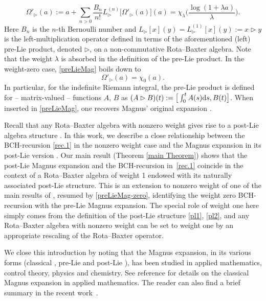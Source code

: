 \documentclass[pdftex]{sigma}
\numberwithin{equation}{section}
\begin{document}
\begin{equation}
\label{preLieMag}
\Omega'_\rhd(a)
:= a + \sum_{n>0} \frac{B_n}{n!} L^{(n)}_{\rhd}\big[\Omega'_\rhd(a)\big](a)
= \chi_{\lambda}\bigg( \frac{\log(1+\lambda a)}{\lambda}\bigg).
\end{equation}
Here $B_n$ is the $n$-th Bernoulli number and $L_{\rhd}[x](y)=L^{(1)}_{\rhd}[x](y):=x \rhd y$ is the left-multiplication operator defined in terms of the aforementioned (left) pre-Lie product, denoted $\rhd$, on a non-commutative Rota--Baxter algebra. Note that the weight $\lambda$ is absorbed in the definition of the pre-Lie product. In the weight-zero case, \eqref{preLieMag} boils down to
\begin{equation}
\label{preLieMag-zero}
\Omega'_\rhd(a)
= \chi_{0}(a).
\end{equation}
In particular, for the indefinite Riemann integral, the pre-Lie product is defined for -- matrix-valued -- functions $A$, $B$ as $(A \rhd B)(t):=\big[\int_0^tA(s){\rm d}s,B(t)\big]$. When inserted in \eqref{preLieMag}, one recovers Magnus' original expansion \cite{WM54}.

Recall that any Rota--Baxter algebra with nonzero weight gives rise to a post-Lie algebra structure \cite{BGN10}. In this work, we describe a close relationship between the BCH-recursion \eqref{rec.1} in the nonzero weight case and the Magnus expansion in its post-Lie version \cite{ELM2015, EI2018, EIM2017,Men2020}. Our main result (Theorem \ref{main Theorem}) shows that the post-Lie Magnus expansion and the BCH-recursion in~\eqref{rec.1} coincide in the context of a Rota--Baxter algebra of weight 1 endowed with its naturally associated post-Lie structure. This is an extension to nonzero weight of one of the main results of \cite{KLM06}, resumed by \eqref{preLieMag-zero}, identifying the weight zero BCH-recursion with the pre-Lie Magnus expansion. The special role of weight one here simply comes from the definition of the post-Lie structure \eqref{pl1}, \eqref{pl2}, and any Rota--Baxter algebra with nonzero weight can be set to weight one by an appropriate rescaling of the Rota--Baxter operator.

We close this introduction by noting that the Magnus expansion, in its various forms (classical \cite{WM54,MP1970}, pre-Lie \cite{AG81, CP13, KM08} and post-Lie \cite{ELM2015, EI2018, EIM2017,Men2020}), has been studied in applied mathematics, control theory, physics and chemistry. See reference \cite{BCOR08} for details on the classical Magnus expansion in applied mathematics. The reader can also find a brief summary in the recent work~\cite{CEO20}.
\end{document}
